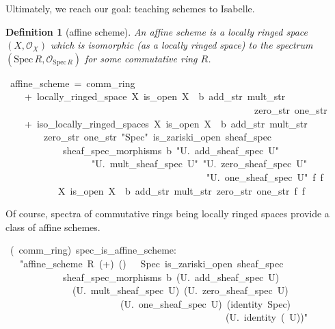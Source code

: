 \documentclass[12pt]{scrartcl}
\newtheorem{definition}[proposition]{Definition}
\def\spec{\text{Spec}\,R}
\begin{document}
Ultimately, we reach our goal: teaching schemes to Isabelle.	

\begin{definition}[affine scheme]
	An affine scheme is a locally ringed space $(X, \mathscr{O}_X)$ which is isomorphic (as a locally ringed space) to the spectrum $(\text{Spec}\,R, \mathscr{O}_{\spec} )$ for some commutative ring $R$. 
\end{definition}

\begin{isabelle}
\ affine\_scheme\ =\ comm\_ring\ \isanewline
\ \ \ \ +\ locally\_ringed\_space\ X\ is\_open\ \isasymO \isactrlsub X\ \isasymrho \ b\ add\_str\ mult\_str\ \isanewline
\ \ \ \ \ \ \ \ \ \ \ \ \ \ \ \ \ \ \ \ \ \ \ \ \ \ \ \ \ \ \ \ \ \ \ \ \ \ \ \ \ \ \ \ \ \ \ \ \ \ \ \ zero\_str\ one\_str\ \isanewline
\ \ \ \ +\ iso\_locally\_ringed\_spaces\ X\ is\_open\ \isasymO \isactrlsub X\ \isasymrho \ b\ add\_str\ mult\_str\isanewline
\ \ \ \ \ \ \ \ zero\_str\ one\_str\ "Spec"\ is\_zariski\_open\ sheaf\_spec\ \isanewline
\ \ \ \ \ \ \ \ \ \ \ \ sheaf\_spec\_morphisms\ \isasymO b\ "\isasymlambda U.\ add\_sheaf\_spec\ U"\isanewline
\ \ \ \ \ \ \ \ \ \ \ \ \ \ \ \ \ \ "\isasymlambda U.\ mult\_sheaf\_spec\ U"\ "\isasymlambda U.\ zero\_sheaf\_spec\ U"\ \isanewline
\ \ \ \ \ \ \ \ \ \ \ \ \ \ \ \ \ \ \ \ \ \ \ \ \ \ \ \ \ \ \ \ \ \ \ \ \ \ \ \ \ \ "\isasymlambda U.\ one\_sheaf\_spec\ U"\ f\ \isasymphi \isactrlsub f\isanewline
\ \ \ \ \ \ \ \ \ \ \ X\ is\_open\ \isasymO \isactrlsub X\ \isasymrho \ b\ add\_str\ mult\_str\ zero\_str\ one\_str\ f\ \isasymphi \isactrlsub f
\end{isabelle}

Of course, spectra of commutative rings being locally ringed spaces provide a class of affine schemes.

\begin{isabelle}
\ (\ comm\_ring)\ spec\_is\_affine\_scheme:\isanewline
\ \ \ "affine\_scheme\ R\ (+)\ (\isasymcdot )\ \isasymzero \ \isasymone \ Spec\ is\_zariski\_open\ sheaf\_spec\ \isanewline
\ \ \ \ \ \ \ \ \ \ \ \ sheaf\_spec\_morphisms\ \isasymO b\ (\isasymlambda U.\ add\_sheaf\_spec\ U)\ \isanewline
\ \ \ \ \ \ \ \ \ \ \ \ \ \ (\isasymlambda U.\ mult\_sheaf\_spec\ U)\ (\isasymlambda U.\ zero\_sheaf\_spec\ U)\ \isanewline
\ \ \ \ \ \ \ \ \ \ \ \ \ \ \ \ \ \ \ \ \ \ \ \ (\isasymlambda U.\ one\_sheaf\_spec\ U)\ (identity\ Spec)\ \isanewline
\ \ \ \ \ \ \ \ \ \ \ \ \ \ \ \ \ \ \ \ \ \ \ \ \ \ \ \ \ \ \ \ \ \ \ \ \ \ \ \ \ \ \ \ \ \ (\isasymlambda U.\ identity\ (\isasymO \ U))"
\end{isabelle}
\end{document}
